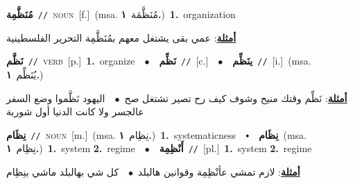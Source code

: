 \documentclass[10pt,a4paper,twoside]{article} %
\begin{document}
\begin{multicols}{2}
{\setlength\topsep{0pt}\textbf{\foreignlanguage{arabic}{مُنَظَّمِة}}\ {\color{gray}\texttt{//}\color{black}}\ \textsc{noun}\ [f.]\ \color{gray}(msa. \foreignlanguage{arabic}{مُنَظَّمَة}~\foreignlanguage{arabic}{\textbf{١.}})\color{black}\ \textbf{1.}~organization\  \begin{flushright}\color{gray}\foreignlanguage{arabic}{\textbf{\underline{\foreignlanguage{arabic}{أمثلة}}}: عمي بقى يشتغل معهم بمُنَظَّمِة التحرير الفلسطينية}\end{flushright}\color{black}} \vspace{2mm}

{\setlength\topsep{0pt}\textbf{\foreignlanguage{arabic}{نَظَّم}}\ {\color{gray}\texttt{//}\color{black}}\ \textsc{verb}\ [p.]\ \textbf{1.}~organize\ \ $\bullet$\ \ \setlength\topsep{0pt}\textbf{\foreignlanguage{arabic}{نَظِّم}}\ {\color{gray}\texttt{//}\color{black}}\ [c.]\ \ $\bullet$\ \ \setlength\topsep{0pt}\textbf{\foreignlanguage{arabic}{ينَظِّم}}\ {\color{gray}\texttt{//}\color{black}}\ [i.]\ \color{gray}(msa. \foreignlanguage{arabic}{يُنَظِّم}~\foreignlanguage{arabic}{\textbf{١.}})\color{black}\  \begin{flushright}\color{gray}\foreignlanguage{arabic}{\textbf{\underline{\foreignlanguage{arabic}{أمثلة}}}: نَظِّم وقتك منيح وشوف كيف رح تصير تشتغل صح\ $\bullet$\ \  اليهود نَظَّموا وضع السفر عالجسر ولا كانت الدنيا أول شوربة}\end{flushright}\color{black}} \vspace{2mm}

{\setlength\topsep{0pt}\textbf{\foreignlanguage{arabic}{نِظَام}}\ {\color{gray}\texttt{//}\color{black}}\ \textsc{noun}\ [m.]\ \color{gray}(msa. \foreignlanguage{arabic}{نِظِام}~\foreignlanguage{arabic}{\textbf{١.}})\color{black}\ \textbf{1.}~systematicness\ \ $\smblkdiamond$\ \ \setlength\topsep{0pt}\textbf{\foreignlanguage{arabic}{نِظَام}}\ \color{gray}(msa. \foreignlanguage{arabic}{نِظِام}~\foreignlanguage{arabic}{\textbf{١.}})\color{black}\ \textbf{1.}~system  \textbf{2.}~regime\ \ $\bullet$\ \ \setlength\topsep{0pt}\textbf{\foreignlanguage{arabic}{أَنْظِمِة}}\ {\color{gray}\texttt{//}\color{black}}\ [pl.]\ \textbf{1.}~system  \textbf{2.}~regime\  \begin{flushright}\color{gray}\foreignlanguage{arabic}{\textbf{\underline{\foreignlanguage{arabic}{أمثلة}}}: لازم تمشي عأنْظِمِة وقوانين هالبلد\ $\bullet$\ \  كل شي بهالبلد ماشي بنِظِام}\end{flushright}\color{black}} \vspace{2mm}


\end{multicols}
\end{document}
